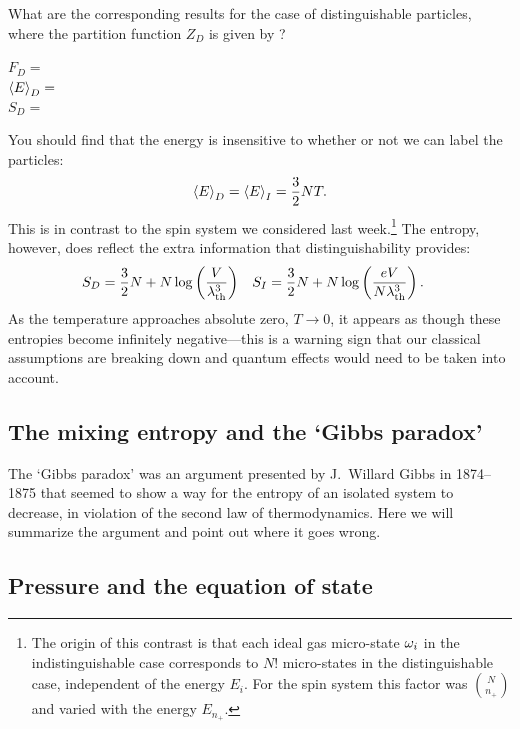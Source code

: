 \newpage %
What are the corresponding results for the case of distinguishable particles, where the partition function $Z_D$ is given by ?
\begin{mdframed}
  $\displaystyle F_D = $ \\[50 pt]
  $\displaystyle \left\langle E \right\rangle_D = $ \\[50 pt]
  $\displaystyle S_D = $ \\[50 pt]
\end{mdframed}
You should find that the energy is insensitive to whether or not we can label the particles:
\begin{equation}
  \label{eq:ideal_energy}
  \left\langle E \right\rangle_D = \left\langle E \right\rangle_I = \frac{3}{2} NT.
\end{equation}
This is in contrast to the spin system we considered last week.\footnote{The origin of this contrast is that each ideal gas micro-state $\omega_i$ in the indistinguishable case corresponds to $N!$ micro-states in the distinguishable case, independent of the energy $E_i$.  For the spin system this factor was $\binom{N}{n_+}$ and varied with the energy $E_{n_+}$.}
The entropy, however, does reflect the extra information that distinguishability provides:
\begin{align}
  \label{eq:ideal_entropy}
  S_D & = \frac{3}{2} N + N \log\left(\frac{V}{\lambda_{\mathrm{th}}^3}\right) &
  S_I & = \frac{3}{2} N + N \log\left(\frac{eV}{N\lambda_{\mathrm{th}}^3}\right).
\end{align}
As the temperature approaches absolute zero, $T \to 0$, it appears as though these entropies become infinitely negative---this is a warning sign that our classical assumptions are breaking down and quantum effects would need to be taken into account.



\subsection{The mixing entropy and the `Gibbs paradox'}
The `Gibbs paradox' was an argument presented by J.\ Willard Gibbs in 1874--1875 that seemed to show a way for the entropy of an isolated system to decrease, in violation of the second law of thermodynamics.
Here we will summarize the argument and point out where it goes wrong.




\newpage %
\subsection{Pressure and the equation of state}


